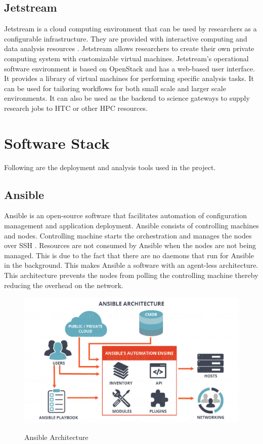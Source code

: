 \documentclass[9pt,twocolumn,twoside]{../../styles/osajnl}
\begin{document}
\subsection{Jetstream}

Jetstream is a cloud computing environment that can be used by
researchers as a configurable infrastructure. They are provided with
interactive computing and data analysis resources
\cite{jetIu}. Jetstream allows researchers to create their own private
computing system with customizable virtual machines. Jetstream’s
operational software environment is based on OpenStack and has a
web-based user interface. It provides a library of virtual machines
for performing specific analysis tasks. It can be used for tailoring
workflows for both small scale and larger scale environments. It can
also be used as the backend to science gateways to supply research
jobs to HTC or other HPC resources.


\section{Software Stack} 

Following are the deployment and analysis tools used in the project.

\subsection{Ansible}

Ansible is an open-source software that facilitates automation of
configuration management and application deployment. Ansible consists
of controlling machines and nodes. Controlling machine starts the
orchestration and manages the nodes over SSH
\cite{ansibleWiki}. Resources are not consumed by Ansible when the
nodes are not being managed. This is due to the fact that there are no
daemons that run for Ansible in the background. This makes Ansible a
software with an agent-less architecture. This architecture prevents
the nodes from polling the controlling machine thereby reducing the
overhead on the network.

\begin{figure}[ht]
  \includegraphics[scale=0.4]{images/ansible_architecture.eps}
  \caption{Ansible Architecture} \cite{ansibleArch}
\end{figure}
\end{document}

